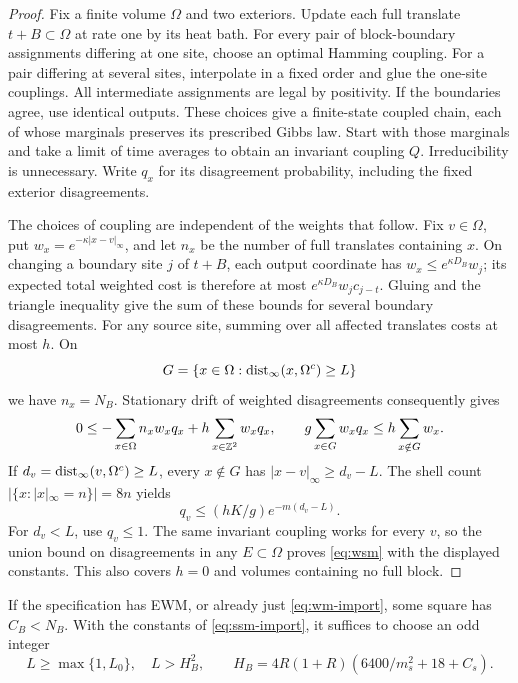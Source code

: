 \begin{proof}
Fix a finite volume \(\Omega\) and two exteriors. Update each full translate \(t+B\subset\Omega\) at rate one by its heat bath. For every pair of block-boundary assignments differing at one site, choose an optimal Hamming coupling. For a pair differing at several sites, interpolate in a fixed order and glue the one-site couplings. All intermediate assignments are legal by positivity. If the boundaries agree, use identical outputs. These choices give a finite-state coupled chain, each of whose marginals preserves its prescribed Gibbs law. Start with those marginals and take a limit of time averages to obtain an invariant coupling \(Q\). Irreducibility is unnecessary. Write \(q_x\) for its disagreement probability, including the fixed exterior disagreements.

The choices of coupling are independent of the weights that follow. Fix \(v\in\Omega\), put \(w_x=e^{-\kappa|x-v|_\infty}\), and let \(n_x\) be the number of full translates containing \(x\). On changing a boundary site \(j\) of \(t+B\), each output coordinate has \(w_x\le e^{\kappa D_B}w_j\); its expected total weighted cost is therefore at most \(e^{\kappa D_B}w_jc_{j-t}\). Gluing and the triangle inequality give the sum of these bounds for several boundary disagreements. For any source site, summing over all affected translates costs at most \(h\). On
\[
G=\{x\in\Omega:\operatorname{dist}_\infty(x,\Omega^c)\ge L\}
\]
we have \(n_x=N_B\). Stationary drift of weighted disagreements consequently gives
\[
0\le-\sum_{x\in\Omega}n_xw_xq_x+h\sum_{x\in\mathbb Z^2}w_xq_x,
\qquad
g\sum_{x\in G}w_xq_x\le h\sum_{x\notin G}w_x.
\]
If \(d_v=\operatorname{dist}_\infty(v,\Omega^c)\ge L\), every \(x\notin G\) has \(|x-v|_\infty\ge d_v-L\). The shell count \(|\{x:|x|_\infty=n\}|=8n\) yields
\[
q_v\le(hK/g)e^{-m(d_v-L)}.
\]
For \(d_v<L\), use \(q_v\le1\). The same invariant coupling works for every \(v\), so the union bound on disagreements in any \(E\subset\Omega\) proves \eqref{eq:wsm} with the displayed constants. This also covers \(h=0\) and volumes containing no full block.
\end{proof}

\begin{lemma}\label{lem:block-complete}
If the specification has EWM, or already just \eqref{eq:wm-import}, some square has \(C_B<N_B\). With the constants of \eqref{eq:ssm-import}, it suffices to choose an odd integer
\[
L\ge\max\{1,L_0\},\quad L>H_B^2,\qquad
H_B=4R(1+R)(6400/m_s^2+18+C_s).
\]
\end{lemma}

